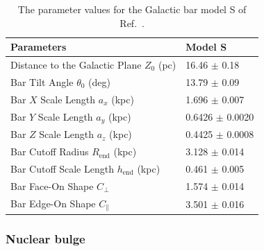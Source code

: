 \documentclass[doublespace,nopageskip]{VTthesis} %
\begin{document}

\begin{table}[htb]
\centering
\caption{ The parameter values for the Galactic bar model S of Ref.~\cite{Freudenreich:1997bx}.}
    \begin{tabular}{ll}
    \toprule
      Parameters & Model S \\ 
      \midrule
      Distance to the Galactic Plane $Z_0$ (pc) & 16.46 $\pm$ 0.18\\
      Bar Tilt Angle $\theta_0$ (deg) & 13.79 $\pm$ 0.09\\
      Bar $X$ Scale Length $a_x$ (kpc) & 1.696 $\pm$ 0.007 \\
      Bar $Y$ Scale Length $a_y$ (kpc) & 0.6426 $\pm$ 0.0020 \\
      Bar $Z$ Scale Length $a_z$ (kpc) & 0.4425 $\pm$ 0.0008 \\
      Bar Cutoff Radius $R_{\text{end}}$ (kpc) & 3.128 $\pm$ 0.014 \\
      Bar Cutoff Scale Length $h_{\text{end}}$ (kpc) & 0.461 $\pm$ 0.005 \\
      Bar Face-On Shape $C_\perp$ & 1.574 $\pm$ 0.014 \\
      Bar Edge-On Shape $C_\parallel$ & 3.501 $\pm$ 0.016\\
      \bottomrule
    \end{tabular}
\label{tab:modelS}
\end{table}

\subsubsection{Nuclear bulge}\label{sec:nb}
\end{document}
